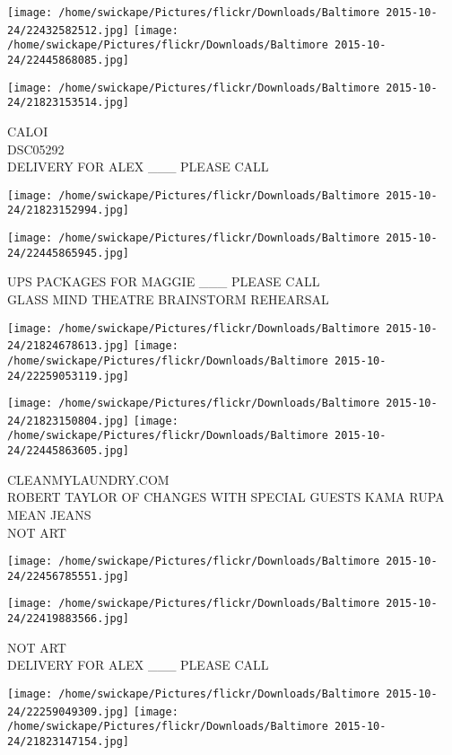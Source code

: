 \documentclass[10pt,letterpaper]{article}
\begin{document}
\texttt{[image: /home/swickape/Pictures/flickr/Downloads/Baltimore 2015-10-24/22432582512.jpg]}
\texttt{[image: /home/swickape/Pictures/flickr/Downloads/Baltimore 2015-10-24/22445868085.jpg]}

\vspace{0.25in}
\texttt{[image: /home/swickape/Pictures/flickr/Downloads/Baltimore 2015-10-24/21823153514.jpg]}

CALOI\\
DSC05292\\
DELIVERY FOR ALEX \_\_\_ PLEASE CALL
\pagebreak

\texttt{[image: /home/swickape/Pictures/flickr/Downloads/Baltimore 2015-10-24/21823152994.jpg]}

\vspace{0.25in}
\texttt{[image: /home/swickape/Pictures/flickr/Downloads/Baltimore 2015-10-24/22445865945.jpg]}

UPS PACKAGES FOR MAGGIE \_\_\_ PLEASE CALL\\
GLASS MIND THEATRE BRAINSTORM REHEARSAL
\pagebreak

\texttt{[image: /home/swickape/Pictures/flickr/Downloads/Baltimore 2015-10-24/21824678613.jpg]}
\texttt{[image: /home/swickape/Pictures/flickr/Downloads/Baltimore 2015-10-24/22259053119.jpg]}

\texttt{[image: /home/swickape/Pictures/flickr/Downloads/Baltimore 2015-10-24/21823150804.jpg]}
\texttt{[image: /home/swickape/Pictures/flickr/Downloads/Baltimore 2015-10-24/22445863605.jpg]}

CLEANMYLAUNDRY.COM\\
ROBERT TAYLOR OF CHANGES WITH SPECIAL GUESTS KAMA RUPA\\
MEAN JEANS\\
NOT ART
\pagebreak

\texttt{[image: /home/swickape/Pictures/flickr/Downloads/Baltimore 2015-10-24/22456785551.jpg]}

\vspace{0.25in}
\texttt{[image: /home/swickape/Pictures/flickr/Downloads/Baltimore 2015-10-24/22419883566.jpg]}

NOT ART\\
DELIVERY FOR ALEX \_\_\_ PLEASE CALL
\pagebreak

\texttt{[image: /home/swickape/Pictures/flickr/Downloads/Baltimore 2015-10-24/22259049309.jpg]}
\texttt{[image: /home/swickape/Pictures/flickr/Downloads/Baltimore 2015-10-24/21823147154.jpg]}
\end{document}

